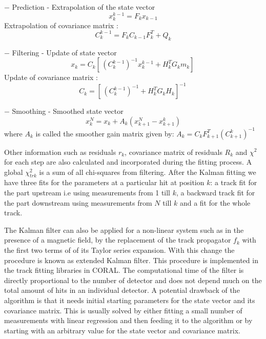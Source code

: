 \begin{description}
\item $-$ Prediction - Extrapolation of the state vector
      \begin{equation}
        x_k^{k-1} = F_k x_{k-1}
      \end{equation}
      Extrapolation of covariance matrix :
      \begin{equation}
        C_k^{k-1} = F_k C_{k-1} F_k^T + Q_k
      \end{equation}

\item $-$ Filtering - Update of state vector
       \begin{equation}
         x_k = C_k [ \, (C^{k-1}_k)^{-1} x_k^{k-1} + H_k^T G_k m_k ] \,
       \end{equation}
       Update of covariance matrix :
       \begin{equation}
         C_k = [ \, (C^{k-1}_k)^{-1} + H_k^T G_k H_k ]^{-1} \,
       \end{equation}

\item $-$ Smoothing - Smoothed state vector
      \begin{equation}
        x_k^{N} = x_k + A_k(x_{k+1}^N - x_{k+1}^k)
      \end{equation}
      where $A_k$ is called the smoother gain matrix given by: $A_k = C_k F_{k+1} ^T (C_{k+1}^k)^{-1}$

\end{description}
Other information such as residuals $r_k$, covariance matrix of residuals $R_k$ and $\chi^2$ for each step are also calculated and incorporated during the fitting process. A global $\chi^2_{trk}$ is a sum of all chi-squares from filtering. After the Kalman fitting we have three fits for the parameters at a particular hit at position $k$: a track fit for the part upstream i.e  using measurements from 1 till $k$, a backward track fit for the part downstream using measurements from $N$ till $k$ and a fit for the whole track.

The Kalman filter can also be applied for a non-linear system such as in the presence of a magnetic field, by the replacement of the track propagator $f_k$ with the first two terms of of its Taylor series expansion. With this change the procedure is known as extended Kalman filter. This procedure is implemented in the track fitting libraries in CORAL. The computational time of the filter is directly proportional to the number of detector and does not depend much on the total amount of hits in an individual detector. A potential drawback of the algorithm is that it needs initial starting parameters for the state vector and its covariance matrix. This is usually solved by either fitting a small number of measurements with linear regression and then feeding it to the algorithm or by starting with an arbitrary value for the state vector and covariance matrix.

